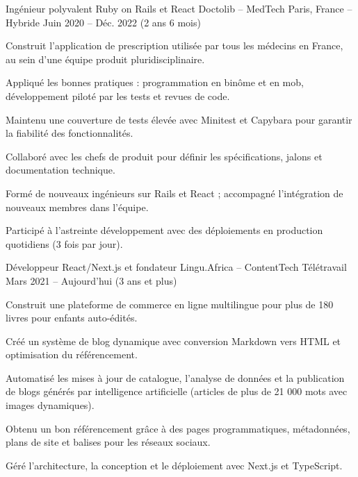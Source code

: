 \begin{cventries}
\cventry
  {Ingénieur polyvalent Ruby on Rails et React}
  {Doctolib – MedTech}
  {Paris, France – Hybride}
  {Juin 2020 – Déc. 2022 (2 ans 6 mois)}
  {
    \begin{cvitems}
      \item {Construit l'application de prescription utilisée par tous les médecins en France, au sein d'une équipe produit pluridisciplinaire.}
      \item {Appliqué les bonnes pratiques : programmation en binôme et en mob, développement piloté par les tests et revues de code.}
      \item {Maintenu une couverture de tests élevée avec Minitest et Capybara pour garantir la fiabilité des fonctionnalités.}
      \item {Collaboré avec les chefs de produit pour définir les spécifications, jalons et documentation technique.}
      \item {Formé de nouveaux ingénieurs sur Rails et React ; accompagné l'intégration de nouveaux membres dans l'équipe.}
      \item {Participé à l'astreinte développement avec des déploiements en production quotidiens (3 fois par jour).}
    \end{cvitems}
  }

\cventry
  {Développeur React/Next.js et fondateur}
  {Lingu.Africa – ContentTech}
  {Télétravail}
  {Mars 2021 – Aujourd'hui (3 ans et plus)}
  {
    \begin{cvitems}
      \item {Construit une plateforme de commerce en ligne multilingue pour plus de 180 livres pour enfants auto-édités.}
      \item {Créé un système de blog dynamique avec conversion Markdown vers HTML et optimisation du référencement.}
      \item {Automatisé les mises à jour de catalogue, l'analyse de données et la publication de blogs générés par intelligence artificielle (articles de plus de 21 000 mots avec images dynamiques).}
      \item {Obtenu un bon référencement grâce à des pages programmatiques, métadonnées, plans de site et balises pour les réseaux sociaux.}
      \item {Géré l'architecture, la conception et le déploiement avec Next.js et TypeScript.}
    \end{cvitems}
  }


\end{cventries}
